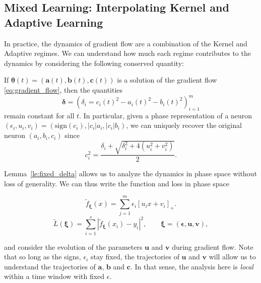 






\subsection{Mixed Learning: Interpolating Kernel and Adaptive Learning}

In practice, the dynamics of gradient flow are a combination of the Kernel and Adaptive regimes. We can understand how much each regime contributes to the dynamics by considering the following conserved quantity:

\begin{lemma} \label{le:fixed_delta}
If $\bm \theta(t) = (\bm a(t), \bm b(t), \bm c(t))$ is a solution of the gradient flow \eqref{eq:gradient_flow}, then the quantities
\begin{equation}\label{eq:invariants}
\bm \delta = (\delta_i = c_i(t)^2 - a_i(t)^2 - b_i(t)^2)_{i=1}^m
\end{equation}
remain constant for all $t$. In particular, given a phase representation of a neuron $(\epsilon_i, u_i,v_i) = (\text{sign}(c_i), |c_i|a_i,|c_i|b_i)$, we can uniquely recover the original neuron $(a_i,b_i,c_i)$ since
\begin{equation}\label{eq:c_uv}
    c_i^2 = \frac{\delta_i + \sqrt{\delta_i^2 + 4 (u_i^2 + v_i^2)}}{2}. 
\end{equation}
\end{lemma}

Lemma~\ref{le:fixed_delta} allows us to analyze the dynamics in phase space without loss of generality. We can thus write the function and loss in phase space

\begin{equation}
    \tilde{f}_{\bm \xi}(x) = \sum_{j=1}^m \epsilon_i [ u_i x + v_i]_+.
\end{equation}
\begin{equation}
    \tilde L(\bm \xi) = \sum_{i=1}^s |\tilde{f}_{\bm \xi}(x_i) - y_i|^2, \qquad \bm \xi = (\bm \epsilon, \bm u, \bm v),  
\end{equation}

and consider the evolution of the parameters $\bm u$ and $\bm v$ during gradient flow. Note that so long as the signs, $\epsilon_i$ stay fixed, the trajectories of $\bm u$ and $\bm v$ will allow us to understand the trajectories of $\bm a$, $\bm b$ and $\bm c$. In that sense, the analysis here is \emph{local} within a time window with fixed $\epsilon$.

